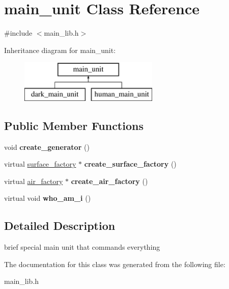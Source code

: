 \hypertarget{classmain__unit}{}\section{main\+\_\+unit Class Reference}
\label{classmain__unit}


{\ttfamily \#include $<$main\+\_\+lib.\+h$>$}

Inheritance diagram for main\+\_\+unit\+:\begin{figure}[H]
\begin{center}
\leavevmode
\includegraphics[height=2.000000cm]{classmain__unit}
\end{center}
\end{figure}
\subsection*{Public Member Functions}
\begin{DoxyCompactItemize}
\item 
\mbox{\label{classmain__unit_a226de91180dca209eb398dda823f6f69}} 
void {\bfseries create\+\_\+generator} ()
\item 
\mbox{\label{classmain__unit_ab6994195071b8ffa812172a4b92a3d11}} 
virtual \mbox{\hyperlink{classsurface__factory}{surface\+\_\+factory}} $\ast$ {\bfseries create\+\_\+surface\+\_\+factory} ()
\item 
\mbox{\label{classmain__unit_a0d7fc9e354ea63f687ba9d71c8933abb}} 
virtual \mbox{\hyperlink{classair__factory}{air\+\_\+factory}} $\ast$ {\bfseries create\+\_\+air\+\_\+factory} ()
\item 
\mbox{\label{classmain__unit_a167578355ad77cf9ae47dba2050c781e}} 
virtual void {\bfseries who\+\_\+am\+\_\+i} ()
\end{DoxyCompactItemize}


\subsection{Detailed Description}
brief special main unit that commands everything 

The documentation for this class was generated from the following file\+:\begin{DoxyCompactItemize}
\item 
main\+\_\+lib.\+h\end{DoxyCompactItemize}
